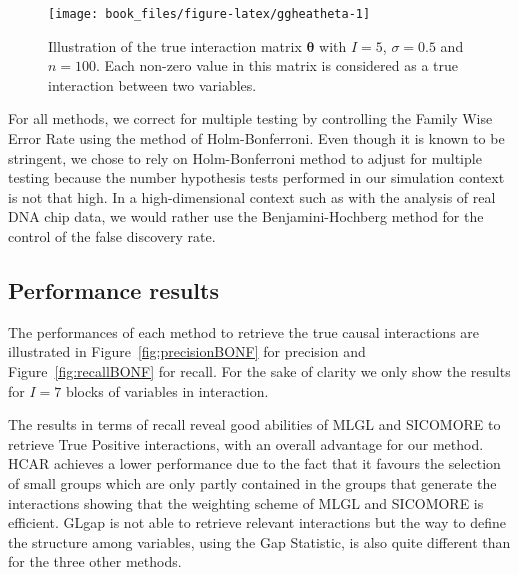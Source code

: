 \documentclass[]{book}
\begin{document}
\begin{figure}

{\centering \texttt{[image: book\_files/figure-latex/ggheatheta-1]} 

}

\caption{Illustration of the true interaction matrix \(\boldsymbol{\theta}\) with \(I = 5\), \(\sigma = 0.5\) and \(n=100\). Each non-zero value in this matrix is considered as a true interaction between two variables.}\label{fig:ggheatheta}
\end{figure}

For all methods, we correct for multiple testing by controlling the
Family Wise Error Rate using the method of Holm-Bonferroni. Even though
it is known to be stringent, we chose to rely on Holm-Bonferroni method
to adjust for multiple testing because the number hypothesis tests
performed in our simulation context is not that high. In a
high-dimensional context such as with the analysis of real DNA chip
data, we would rather use the Benjamini-Hochberg method for the control
of the false discovery rate.

\hypertarget{performance-results}{%
\subsection{Performance results}\label{performance-results}}

The performances of each method to retrieve the true causal interactions
are illustrated in Figure~\ref{fig:precisionBONF} for precision and
Figure~\ref{fig:recallBONF} for recall. For the sake of clarity we only show
the results for \(I=7\) blocks of variables in interaction.

The results in terms of recall reveal good abilities of MLGL and
SICOMORE to retrieve True Positive interactions, with an overall
advantage for our method. HCAR achieves a lower performance due to the
fact that it favours the selection of small groups which are only partly
contained in the groups that generate the interactions showing that the
weighting scheme of MLGL and SICOMORE is efficient. GLgap is not able to
retrieve relevant interactions but the way to define the structure among
variables, using the Gap Statistic, is also quite different than for the
three other methods.
\end{document}
